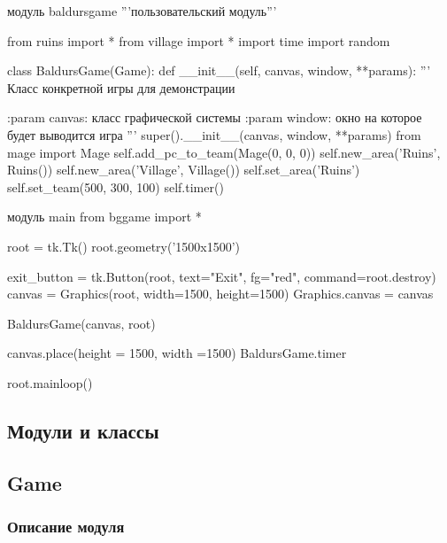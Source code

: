 модуль baldursgame '''пользовательский модуль'''

from ruins import *
from village import *
import time
import random

class BaldursGame(Game):
def \_\_init\_\_(self, canvas, window, **params):
'''
Класс конкретной игры для демонстрации

:param canvas: класс графической системы
:param window: окно на которое будет выводится игра
'''
super().\_\_init\_\_(canvas, window, **params)
from mage import Mage
self.add\_pc\_to\_team(Mage(0, 0, 0))
self.new\_area('Ruins', Ruins())
self.new\_area('Village', Village())
self.set\_area('Ruins')
self.set\_team(500, 300, 100)
self.timer()

модуль main
from bggame import *

root = tk.Tk()
root.geometry('1500x1500')

exit\_button = tk.Button(root, text="Exit", fg="red", command=root.destroy)
canvas = Graphics(root, width=1500, height=1500)
Graphics.canvas = canvas

BaldursGame(canvas, root)

canvas.place(height = 1500, width =1500)
BaldursGame.timer

root.mainloop()


\subsection{Модули и классы}
\subsection{Game}
\subsubsection{Описание модуля}
